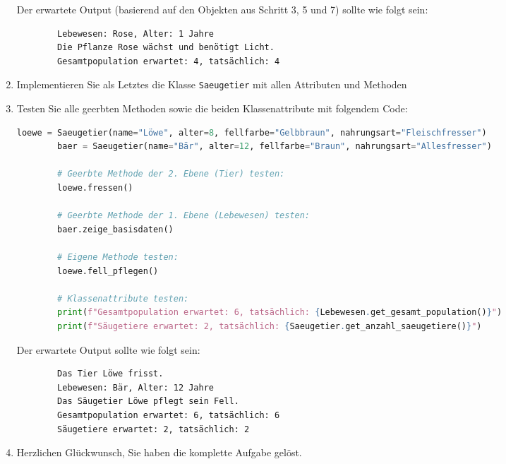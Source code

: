 \begin{myexercise}
\begin{enumerate}
    Der erwartete Output (basierend auf den Objekten aus Schritt 3, 5 und 7) sollte wie folgt sein:
    \begin{lstlisting}
        Lebewesen: Rose, Alter: 1 Jahre
        Die Pflanze Rose wächst und benötigt Licht.
        Gesamtpopulation erwartet: 4, tatsächlich: 4
    \end{lstlisting}

    \item Implementieren Sie als Letztes die Klasse \texttt{Saeugetier} mit allen Attributen und Methoden
    \item Testen Sie alle geerbten Methoden sowie die beiden Klassenattribute mit folgendem Code:
    \begin{lstlisting}[language=Python, basicstyle=\ttfamily\small]
        loewe = Saeugetier(name="Löwe", alter=8, fellfarbe="Gelbbraun", nahrungsart="Fleischfresser")
        baer = Saeugetier(name="Bär", alter=12, fellfarbe="Braun", nahrungsart="Allesfresser")

        # Geerbte Methode der 2. Ebene (Tier) testen:
        loewe.fressen()

        # Geerbte Methode der 1. Ebene (Lebewesen) testen:
        baer.zeige_basisdaten()

        # Eigene Methode testen:
        loewe.fell_pflegen()

        # Klassenattribute testen:
        print(f"Gesamtpopulation erwartet: 6, tatsächlich: {Lebewesen.get_gesamt_population()}")
        print(f"Säugetiere erwartet: 2, tatsächlich: {Saeugetier.get_anzahl_saeugetiere()}")
    \end{lstlisting}
    
    Der erwartete Output sollte wie folgt sein:
    \begin{lstlisting}
        Das Tier Löwe frisst.
        Lebewesen: Bär, Alter: 12 Jahre
        Das Säugetier Löwe pflegt sein Fell.
        Gesamtpopulation erwartet: 6, tatsächlich: 6
        Säugetiere erwartet: 2, tatsächlich: 2
    \end{lstlisting}
    \item Herzlichen Glückwunsch, Sie haben die komplette Aufgabe gelöst. 
\end{enumerate}

\end{myexercise}


